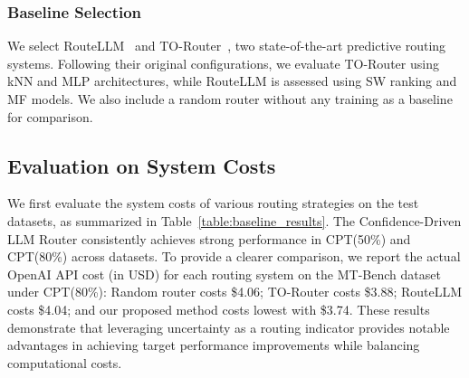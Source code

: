 \begin{table}[t]
\begin{center}
\caption{
Response quality comparison of routing systems on the GSM8K dataset. Higher LLM-judge scores reflect better response quality.
}
\vspace{-2mm}
\end{center}
\vspace{-7mm}
\end{table}


\subsubsection{Baseline Selection}
We select RouteLLM~\cite{Ong2024RouteLLMLT} and TO-Router~\cite{Stripelis2024TensorOperaRA}, two state-of-the-art predictive routing systems. Following their original configurations, we evaluate TO-Router using kNN and MLP architectures, while RouteLLM is assessed using SW ranking and MF models. We also include a random router without any training as a baseline for comparison.



\subsection{Evaluation on System Costs}
We first evaluate the system costs of various routing strategies on the test datasets, as summarized in Table~\ref{table:baseline_results}. The Confidence-Driven LLM Router consistently achieves strong performance in CPT(50\%) and CPT(80\%) across datasets.
%
To provide a clearer comparison, we report the actual OpenAI API cost (in USD) for each routing system on the MT-Bench dataset under CPT(80\%): Random router costs \$4.06; TO-Router costs \$3.88; RouteLLM costs \$4.04; and our proposed method costs lowest with \$3.74. 
%
These results demonstrate that leveraging uncertainty as a routing indicator provides notable advantages in achieving target performance improvements while balancing computational costs.

